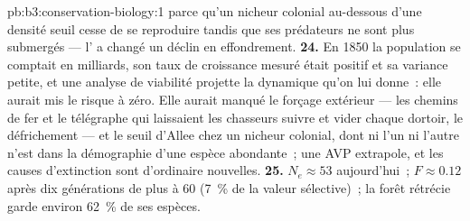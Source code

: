 \begin{solution}{pb:b3:conservation-biology:1}
parce qu'un nicheur colonial au-dessous d'une densité seuil cesse de se
reproduire tandis que ses prédateurs ne sont plus submergés --- l' a changé un déclin en effondrement.
\textbf{24.} En 1850 la population se comptait en milliards, son taux de
croissance mesuré était positif et sa variance petite, et une analyse de
viabilité projette la dynamique qu'on lui donne~: elle aurait mis le
risque à zéro. Elle aurait manqué le forçage extérieur --- les chemins
de fer et le télégraphe qui laissaient les chasseurs suivre et vider
chaque dortoir, le défrichement --- et le seuil d'Allee chez un nicheur
colonial, dont ni l'un ni l'autre n'est dans la démographie d'une espèce
abondante~; une AVP extrapole, et les causes d'extinction sont
d'ordinaire nouvelles.
\textbf{25.} $N_{e} \approx 53$ aujourd'hui~; $F \approx 0.12$ après dix
générations de plus à 60 (\qty{7}{\%} de la valeur sélective)~; la forêt
rétrécie garde environ \qty{62}{\%} de ses espèces.
\end{solution}

